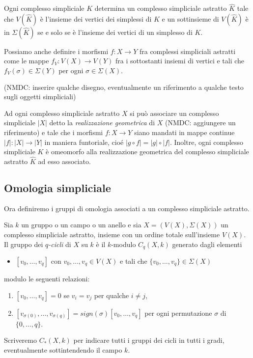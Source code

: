 \begin{rmk}
  Ogni complesso simpliciale $K$ determina un complesso simpliciale astratto $\widehat{K}$ tale che $V(\widehat{K})$ è l'insieme dei vertici dei simplessi di $K$ e un sottinsieme di $V(\widehat{K})$ è in $\Sigma(\widehat{K})$ se e solo se è l'insieme dei vertici di un simplesso di $K$.
\end{rmk}

Possiamo anche definire i morfismi $f:X\to Y$ fra complessi simpliciali astratti come le mappe $f_V:V(X)\to V(Y)$ fra i sottostanti insiemi di vertici e tali che $f_V(\sigma)\in \Sigma(Y)$ per ogni $\sigma \in \Sigma(X)$.

(NMDC: inserire qualche disegno, eventualmente un riferimento a qualche testo sugli oggetti simpliciali)

Ad ogni complesso simpliciale astratto $X$ si può associare un complesso simpliciale $|X|$ detto la \emph{realizzazione geometrica} di $X$ (NMDC: aggiungere un riferimento) e tale che i morfismi $f:X\to Y$ siano mandati in mappe continue $|f|:|X|\to |Y|$ in maniera funtoriale, cioé $|g\circ f|=|g|\circ |f|$. Inoltre, ogni complesso simpliciale $K$ è omeomorfo alla realizzazione geometrica del complesso simpliciale astratto $\widehat{K}$ ad esso associato.

\subsection{Omologia simpliciale}

Ora definiremo i gruppi di omologia associati a un complesso simpliciale astratto.

\begin{definition}
  Sia $k$ un gruppo o un campo o un anello e
  sia $X=(V(X),\Sigma(X))$ un complesso simpliciale astratto, insieme con un ordine totale sull'insieme $V(X)$. Il gruppo dei \emph{$q$-cicli} di $X$ su $k$ è il $k$-modulo $C_q(X,k)$ generato dagli elementi
  \begin{itemize}
    \item $[v_0,\dots, v_q]$ con $v_0,\dots, v_q\in V(X)$ e tali che $\{v_0,\dots,v_q\}\in\Sigma(X)$
  \end{itemize}
  modulo le seguenti relazioni:
  \begin{enumerate}
    \item $[v_0,\dots,v_q]=0$ se $v_i = v_j$ per qualche $i\neq j$,
    \item $[v_{\sigma(0)},\dots,v_{\sigma(q)}]=sign(\sigma)[v_0,\dots,v_q]$ per ogni permutazione $\sigma$ di $\{0,\dots,q\}$.
  \end{enumerate}

  Scriveremo $C_*(X,k)$ per indicare tutti i gruppi dei cicli in tutti i gradi, eventualmente sottintendendo il campo $k$.
\end{definition}

